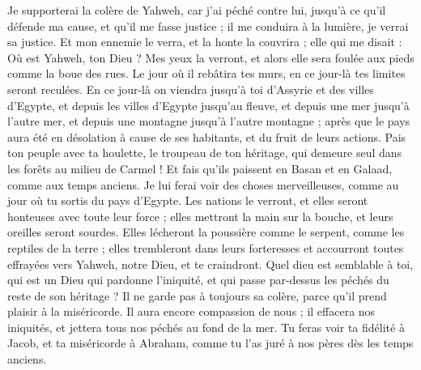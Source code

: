 \begin{multicols}{2}
Je supporterai la colère de Yahweh, car j'ai péché contre lui, jusqu'à ce qu'il défende ma cause, et qu'il me fasse justice ; il me conduira à la lumière, je verrai sa justice.
Et mon ennemie le verra, et la honte la couvrira ; elle qui me disait : Où est Yahweh, ton Dieu ? Mes yeux la verront, et alors elle sera foulée aux pieds comme la boue des rues.
Le jour où il rebâtira tes murs, en ce jour-là tes limites seront reculées.
En ce jour-là on viendra jusqu'à toi d'Assyrie et des villes d'Egypte, et depuis les villes d'Egypte jusqu'au fleuve, et depuis une mer jusqu'à l'autre mer, et depuis une montagne jusqu'à l'autre montagne ;
après que le pays aura été en désolation à cause de ses habitants, et du fruit de leurs actions.
Pais ton peuple avec ta houlette, le troupeau de ton héritage, qui demeure seul dans les forêts au milieu de Carmel ! Et fais qu'ils paissent en Basan et en Galaad, comme aux temps anciens.
Je lui ferai voir des choses merveilleuses, comme au jour où tu sortis du pays d'Egypte.
Les nations le verront, et elles seront honteuses avec toute leur force ; elles mettront la main sur la bouche, et leurs oreilles seront sourdes.
Elles lécheront la poussière comme le serpent, comme les reptiles de la terre ; elles trembleront dans leurs forteresses et accourront toutes effrayées vers Yahweh, notre Dieu, et te craindront.
Quel dieu est semblable à toi, qui est un Dieu qui pardonne l'iniquité, et qui passe par-dessus les péchés du reste de son héritage ? Il ne garde pas à toujours sa colère, parce qu'il prend plaisir à la miséricorde.
Il aura encore compassion de nous ; il effacera nos iniquités, et jettera tous nos péchés au fond de la mer.
Tu feras voir ta fidélité à Jacob, et ta miséricorde à Abraham, comme tu l'as juré à nos pères dès les temps anciens.
\PPE{}
\end{multicols}
